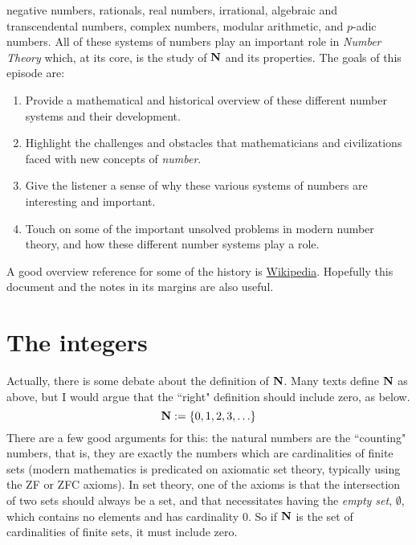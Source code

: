 \documentclass[11pt,oneside]{amsart}
\begin{document}
negative numbers,
rationals, real numbers, irrational, algebraic and transcendental numbers, 
complex numbers, modular arithmetic, and $p$-adic numbers.  
All of these systems of numbers play an important role in {\em Number Theory} 
which, at its core, is the study of $\mathbf{N}$ and its properties.  
The goals of this episode are:
\begin{enumerate}
	\item Provide a mathematical and historical overview of these different number 
        systems and their development.
	\item Highlight the challenges and obstacles that mathematicians and 
        civilizations faced with new concepts of \emph{number}.
	\item Give the listener a sense of why these various systems of numbers are 
        interesting and important.
	\item Touch on some of the important unsolved problems in modern number 
        theory, and how these different number systems play a role.
\end{enumerate} 
A good overview reference for some of the history is 
  \href{https://en.wikipedia.org/wiki/Number}{Wikipedia}.
Hopefully this document and the notes in its margins are also useful.

\section{The integers}
Actually, there is some debate about the definition of $\mathbf{N}$.  
Many texts define $\mathbf{N}$ as above, 
  but I would argue that the ``right" definition should include zero, as below.
\[\mathbf{N}:=\{0,1,2,3,\ldots\}\]
There are a few good arguments for this: 
  the natural numbers are the ``counting" numbers, 
  that is, they are exactly the numbers which
  are cardinalities of finite sets
  (modern mathematics is predicated on axiomatic set theory, 
  typically using the ZF or ZFC axioms).
In set theory, one of the axioms is that the intersection of two sets should 
  always be a set, and that necessitates having the {\em empty set}, 
  $\emptyset$,
  which contains no elements and has cardinality $0$.  
  So if $\mathbf{N}$ is the set of cardinalities of finite sets, it must include zero.
\end{document}

